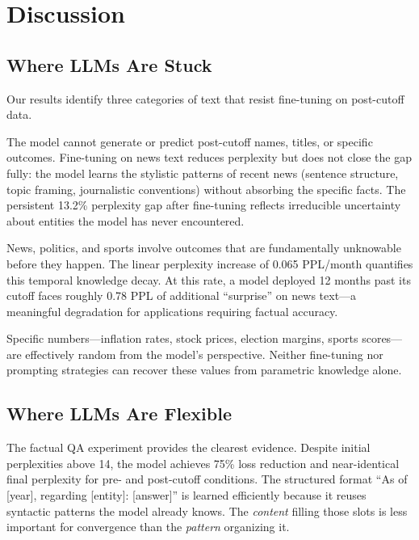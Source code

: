 \section{Discussion}
\label{sec:discussion}

\subsection{Where LLMs Are Stuck}

Our results identify three categories of text that resist fine-tuning on post-cutoff data.

 The model cannot generate or predict post-cutoff names, titles, or specific outcomes. Fine-tuning on news text reduces perplexity but does not close the gap fully: the model learns the stylistic patterns of recent news (sentence structure, topic framing, journalistic conventions) without absorbing the specific facts. The persistent 13.2\% perplexity gap after fine-tuning reflects irreducible uncertainty about entities the model has never encountered.

 News, politics, and sports involve outcomes that are fundamentally unknowable before they happen. The linear perplexity increase of 0.065 PPL/month quantifies this temporal knowledge decay. At this rate, a model deployed 12 months past its cutoff faces roughly 0.78 PPL of additional ``surprise'' on news text---a meaningful degradation for applications requiring factual accuracy.

 Specific numbers---inflation rates, stock prices, election margins, sports scores---are effectively random from the model's perspective. Neither fine-tuning nor prompting strategies can recover these values from parametric knowledge alone.

\subsection{Where LLMs Are Flexible}

 The factual QA experiment provides the clearest evidence. Despite initial perplexities above 14, the model achieves 75\% loss reduction and near-identical final perplexity for pre- and post-cutoff conditions. The structured format ``As of [year], regarding [entity]: [answer]'' is learned efficiently because it reuses syntactic patterns the model already knows. The \emph{content} filling those slots is less important for convergence than the \emph{pattern} organizing it.


